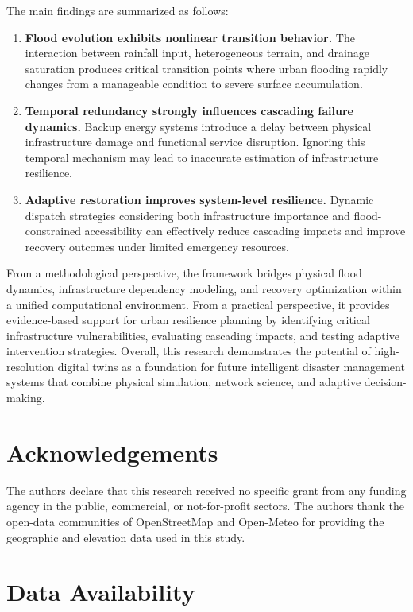 \documentclass[preprint,12pt]{elsarticle}
\begin{document}
The main findings are summarized as follows:
\begin{enumerate}
\item \textbf{Flood evolution exhibits nonlinear transition behavior.} The
interaction between rainfall input, heterogeneous terrain, and drainage
saturation produces critical transition points where urban flooding rapidly
changes from a manageable condition to severe surface accumulation.
\item \textbf{Temporal redundancy strongly influences cascading failure
dynamics.} Backup energy systems introduce a delay between physical
infrastructure damage and functional service disruption. Ignoring this
temporal mechanism may lead to inaccurate estimation of infrastructure
resilience.
\item \textbf{Adaptive restoration improves system-level resilience.}
Dynamic dispatch strategies considering both infrastructure importance and
flood-constrained accessibility can effectively reduce cascading impacts and
improve recovery outcomes under limited emergency resources.
\end{enumerate}

From a methodological perspective, the framework bridges physical flood
dynamics, infrastructure dependency modeling, and recovery optimization
within a unified computational environment. From a practical perspective, it
provides evidence-based support for urban resilience planning by identifying
critical infrastructure vulnerabilities, evaluating cascading impacts, and
testing adaptive intervention strategies. Overall, this research demonstrates
the potential of high-resolution digital twins as a foundation for future
intelligent disaster management systems that combine physical simulation,
network science, and adaptive decision-making.

\section*{Acknowledgements}
The authors declare that this research received no specific grant from any
funding agency in the public, commercial, or not-for-profit sectors. The
authors thank the open-data communities of OpenStreetMap and Open-Meteo for
providing the geographic and elevation data used in this study.

\section*{Data Availability}
\end{document}
